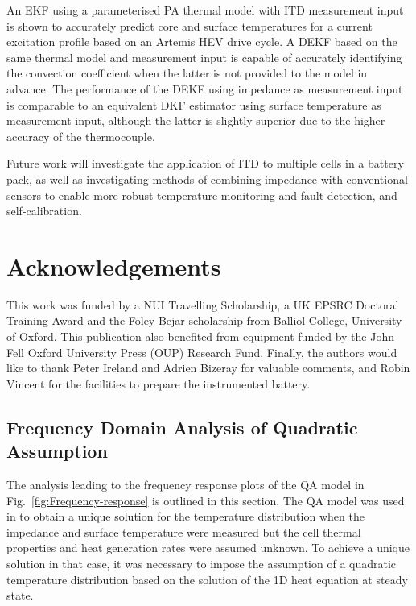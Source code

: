 \documentclass[journal, english]{IEEEtran}
\begin{document}
An EKF using a parameterised PA thermal model with ITD measurement
input is shown to accurately predict core and surface temperatures
for a current excitation profile based on an Artemis HEV drive cycle.
A DEKF based on the same thermal model and measurement input is capable
of accurately identifying the convection coefficient when the latter
is not provided to the model in advance. The performance of the DEKF
using impedance as measurement input is comparable to an equivalent
DKF estimator using surface temperature as measurement input, although
the latter is slightly superior due to the higher accuracy of the thermocouple.

Future work will investigate the application of ITD to multiple cells
in a battery pack, as well as investigating methods of combining impedance
with conventional sensors to enable more robust temperature monitoring
and fault detection, and self-calibration.

\section*{Acknowledgements}
This work was funded by a NUI Travelling
Scholarship, a UK EPSRC Doctoral Training Award and the Foley-Bejar scholarship from Balliol
College, University of Oxford. This publication also benefited from
equipment funded by the John Fell Oxford University Press (OUP) Research
Fund.
Finally, the authors would like to thank Peter Ireland and Adrien Bizeray for valuable comments, and Robin Vincent for the facilities to prepare the instrumented battery.



\appendix{} \subsection{Frequency Domain Analysis of Quadratic Assumption\label{sub:Frequency-domain-analysis}}
The analysis leading to the frequency response plots
of the QA model in Fig.\ \ref{fig:Frequency-response} is outlined in this section. 
The QA model was used in \cite{Richardson2014} to obtain a unique solution for the temperature distribution when the impedance and surface temperature were measured but the cell thermal properties and heat generation rates were assumed unknown. To achieve a unique solution in that case, it was necessary to impose the assumption of a quadratic temperature distribution based on the solution of the 1D heat equation at steady state.
\end{document}
